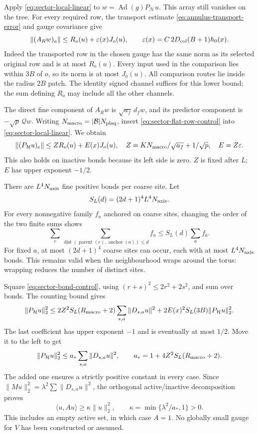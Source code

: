 Apply \eqref{eq:sector-local-linear} to
$w=\operatorname{Ad}(g)P_{\mathcal H}u$. This array still
vanishes on the tree. For every required row, the transport estimate
\eqref{eq:annulus-transport-error} and gauge covariance give
\begin{equation}\label{eq:sector-flat-row-control}
 \|(A_Rw)_a\|\le R_o(u)+\varepsilon(x)J_o(u),
 \qquad \varepsilon(x)=C\,2D_{\rm col}(B+1)h_0(x).
\end{equation}
Indeed the transported row in the chosen gauge has the same norm as
its selected original row and is at most $R_o(u)$. Every input
used in the comparison lies within $3B$ of $o$, so its norm is
at most $J_o(u)$. All comparison routes lie inside the radius
$2B$ patch. The identity signed channel suffices for this lower
bound; the sum defining $R_o$ may include all the other channels.

The direct fine component of $A_Rw$ is $\sqrt{a_f}\,d_fw$,
and its predictor component is $-\sqrt p\,\mathcal Qw$.
Writing $N_{\rm macro}=|\mathcal B|N_{\rm plaq}$, insert
\eqref{eq:sector-flat-row-control} into
\eqref{eq:sector-local-linear}. We obtain
\begin{equation}\label{eq:sector-bond-control}
 \|(P_{\mathcal H}u)_e\|
 \le ZR_o(u)+E(x)J_o(u),
 \quad Z=K N_{\rm macro}/\sqrt{a_f}+1/\sqrt p,
 \quad E=Z\varepsilon.
\end{equation}
This also holds on inactive bonds because its left side is zero.
$Z$ is fixed after $L$; $E$ has upper exponent $-1/2$.

There are $L^4N_{\rm axis}$ fine positive bonds per coarse site.
Let
\[
 S_L(d)=(2d+1)^4L^4N_{\rm axis}.
\]
For every nonnegative family $f_a$ anchored on coarse sites,
changing the order of the two finite sums shows
\[
 \sum_e\sum_{\operatorname{dist}(\operatorname{parent}(e),
                                    \operatorname{anchor}(a))\le d} f_a
 \le S_L(d)\sum_a f_a.
\]
For fixed $a$, at most $(2d+1)^4$ coarse sites can occur, each
with at most $L^4N_{\rm axis}$ bonds. This remains valid when
the neighbourhood wraps around the torus: wrapping reduces the
number of distinct sites.

Square \eqref{eq:sector-bond-control}, using
$(r+s)^2\le2r^2+2s^2$, and sum over bonds. The counting bound gives
\[
 \|P_{\mathcal H}u\|_2^2
 \le2Z^2S_L(R_{\rm macro}+2)\sum_{s,a}\|D_{s,a}u\|^2
       +2E(x)^2S_L(3B)\|P_{\mathcal H}u\|_2^2.
\]
The last coefficient has upper exponent $-1$ and is eventually
at most $1/2$. Move it to the left to get
\[
 \|P_{\mathcal H}u\|_2^2
 \le a_*\sum_{s,a}\|D_{s,a}u\|^2,
 \qquad a_*=1+4Z^2S_L(R_{\rm macro}+2).
\]
The added one ensures a strictly positive constant in every case.
Since $\|Mu\|_2^2=\lambda^2\sum\|D_{s,a}u\|^2$, the
orthogonal active/inactive decomposition proves
\begin{equation}\label{eq:sector-gram-floor}
 \langle u,Au\rangle\ge\kappa\|u\|_2^2,
 \qquad \kappa=\min\{\lambda^2/a_*,1\}>0.
\end{equation}
This includes an empty active set, in which case $A=1$.
No globally small gauge for $V$ has been constructed or assumed.

